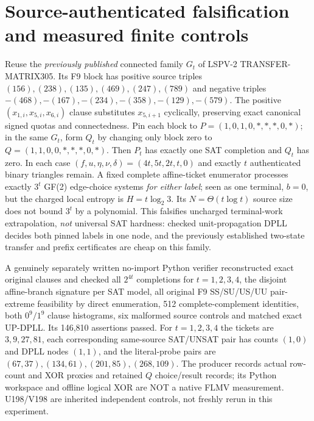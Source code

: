 \documentclass[11pt]{article}
\begin{document}
\section{Source-authenticated falsification and measured finite controls}
Reuse the \emph{previously published} connected family $G_t$ of LSPV-2 TRANSFER-MATRIX305. Its F9 block has positive source triples $(156),(238),(135),(469),(247),(789)$ and negative triples $-(468),-(167),-(234),-(358),-(129),-(579)$. The positive $(x_{1,i},x_{5,i},x_{6,i})$ clause substitutes $x_{5,i+1}$ cyclically, preserving exact canonical signed quotas and connectedness. Pin each block to $P=(1,0,1,0,*,*,*,0,*)$; in the same $G_t$, form $Q_t$ by changing only block zero to $Q=(1,1,0,0,*,*,*,0,*)$. Then $P_t$ has exactly one SAT completion and $Q_t$ has zero. In each case $(f,u,\eta,\nu,\delta)=(4t,5t,2t,t,0)$ and exactly $t$ authenticated binary triangles remain.
A fixed complete affine-ticket enumerator processes exactly $3^t$ GF(2) edge-choice systems \emph{for either label}; seen as one terminal, $b=0$, but the charged local entropy is $H=t\log_2 3$. Its $N=\Theta(t\log t)$ source size does not bound $3^t$ by a polynomial. This falsifies uncharged terminal-work extrapolation, \emph{not} universal SAT hardness: checked unit-propagation DPLL decides both pinned labels in one node, and the previously established two-state transfer and prefix certificates are cheap on this family.

A genuinely separately written no-import Python verifier reconstructed exact original clauses and checked all $2^{4t}$ completions for $t=1,2,3,4$, the disjoint affine-branch signature per SAT model, all original F9 SS/SU/US/UU pair-extreme feasibility by direct enumeration, 512 complete-complement identities, both $0^9/1^9$ clause histograms, six malformed source controls and matched exact UP-DPLL. Its 146,810 assertions passed. For $t=1,2,3,4$ the tickets are $3,9,27,81$, each corresponding same-source SAT/UNSAT pair has counts $(1,0)$ and DPLL nodes $(1,1)$, and the literal-probe pairs are $(67,37),(134,61),(201,85),(268,109)$. The producer records actual row-count and XOR proxies and retained $Q$ choice/result records; its Python workspace and offline logical XOR are NOT a native FLMV measurement. U198/V198 are inherited independent controls, not freshly rerun in this experiment.
\end{document}
